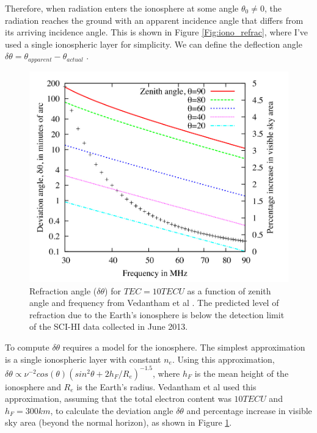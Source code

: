 Therefore, when radiation enters the ionosphere at some angle $\theta_0 \neq 0$, the radiation reaches the ground with an apparent incidence angle that differs from its arriving incidence angle. This is shown in Figure \ref{Fig:iono_refrac}, where I've used a single ionospheric layer for simplicity. We can define the deflection angle $\delta \theta = \theta_{apparent}-\theta_{actual}$ \cite{thompson_2001}.


\begin{figure}[htb]
\begin{center}
\includegraphics[width=0.85\linewidth]{Ionosphere/figures/refraction_impact.jpg}
\caption{Refraction angle ($\delta \theta$) for $TEC= 10 TECU$ as a function of zenith angle and frequency from Vedantham et al \cite{vedantham_2014}. The predicted level of refraction due to the Earth's ionosphere is below the detection limit of the SCI-HI data collected in June 2013.} 
\label{Fig:refrac_est}
\end{center}
\end{figure} 

To compute $\delta \theta$ requires a model for the ionosphere. The simplest approximation is a single ionospheric layer with constant $n_e$. Using this approximation, $\delta \theta \propto \nu^{-2} cos(\theta)(sin^2 \theta + 2 h_F/R_e)^{-1.5}$, where $h_F$ is the mean height of the ionosphere and $R_e$ is the Earth's radius. Vedantham et al \cite{vedantham_2014} used this approximation, assuming that the total electron content was $10 TECU$ and $h_F = 300 km$, to calculate the deviation angle $\delta \theta$ and percentage increase in visible sky area (beyond the normal horizon), as shown in Figure \ref{Fig:refrac_est}. 


